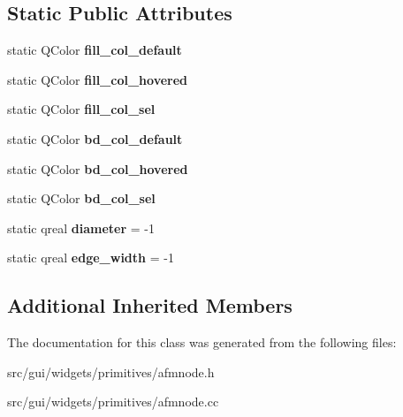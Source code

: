 \subsection*{Static Public Attributes}
\begin{DoxyCompactItemize}
\item 
static Q\+Color {\bfseries fill\+\_\+col\+\_\+default}\hypertarget{classprim_1_1AFMNode_aae20b36394bc57ec78f4f1c1e3ed2cf9}{}\label{classprim_1_1AFMNode_aae20b36394bc57ec78f4f1c1e3ed2cf9}

\item 
static Q\+Color {\bfseries fill\+\_\+col\+\_\+hovered}\hypertarget{classprim_1_1AFMNode_a12e4088c245888c13001fa6db4c61139}{}\label{classprim_1_1AFMNode_a12e4088c245888c13001fa6db4c61139}

\item 
static Q\+Color {\bfseries fill\+\_\+col\+\_\+sel}\hypertarget{classprim_1_1AFMNode_a6870910a0ee0a0b634efb714d6665eb4}{}\label{classprim_1_1AFMNode_a6870910a0ee0a0b634efb714d6665eb4}

\item 
static Q\+Color {\bfseries bd\+\_\+col\+\_\+default}\hypertarget{classprim_1_1AFMNode_a8e4868b263114fb14d5b3066c6d418cf}{}\label{classprim_1_1AFMNode_a8e4868b263114fb14d5b3066c6d418cf}

\item 
static Q\+Color {\bfseries bd\+\_\+col\+\_\+hovered}\hypertarget{classprim_1_1AFMNode_a2ab85cc5d7f630d23214b91bd5b368fa}{}\label{classprim_1_1AFMNode_a2ab85cc5d7f630d23214b91bd5b368fa}

\item 
static Q\+Color {\bfseries bd\+\_\+col\+\_\+sel}\hypertarget{classprim_1_1AFMNode_ad8bbc3690d2849c78c159c5b996fc44f}{}\label{classprim_1_1AFMNode_ad8bbc3690d2849c78c159c5b996fc44f}

\item 
static qreal {\bfseries diameter} = -\/1\hypertarget{classprim_1_1AFMNode_a15dd05c914456bc0968317a675624c72}{}\label{classprim_1_1AFMNode_a15dd05c914456bc0968317a675624c72}

\item 
static qreal {\bfseries edge\+\_\+width} = -\/1\hypertarget{classprim_1_1AFMNode_ac2896ca32cff3cd7e77eefa609e7110e}{}\label{classprim_1_1AFMNode_ac2896ca32cff3cd7e77eefa609e7110e}

\end{DoxyCompactItemize}
\subsection*{Additional Inherited Members}


The documentation for this class was generated from the following files\+:\begin{DoxyCompactItemize}
\item 
src/gui/widgets/primitives/afmnode.\+h\item 
src/gui/widgets/primitives/afmnode.\+cc\end{DoxyCompactItemize}
